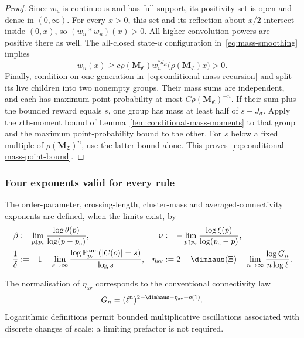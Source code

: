 \begin{proof}
Since $w_u$ is continuous and has full support, its positivity set is open and dense in $(0,\infty)$.
For every $x>0$, this set and its reflection about $x/2$ intersect inside $(0,x)$, so $(w_u*w_u)(x)>0$.
All higher convolution powers are positive there as well.
The all-closed state-$u$ configuration in~\eqref{eq:mass-smoothing} implies
\[
 w_u(x)\ge c\rho(\mathbf M_{\mathfrak C})
 w_u^{*d_R}\bigl(\rho(\mathbf M_{\mathfrak C})x\bigr)>0.
\]
Finally, condition on one generation in~\eqref{eq:conditional-mass-recursion} and split its live children into two nonempty groups.
Their mass sums are independent, and each has maximum point probability at most $C\rho(\mathbf M_{\mathfrak C})^{-n}$.
If their sum plus the bounded reward equals $s$, one group has mass at least half of $s-J_\sigma$.
Apply the $r$th-moment bound of Lemma~\ref{lem:conditional-mass-moments} to that group and the maximum point-probability bound to the other.
For $s$ below a fixed multiple of $\rho(\mathbf M_{\mathfrak C})^n$, use the latter bound alone.
This proves~\eqref{eq:conditional-mass-point-bound}.
\end{proof}


\subsubsection*{Four exponents valid for every rule}
\begin{definition}\label{def:four-exponents}
The order-parameter, crossing-length, cluster-mass and averaged-connectivity exponents are defined, when the limits exist, by
\begin{align*}
 \beta&:=\lim_{p\downarrow p_c}\frac{\log\theta(p)}{\log(p-p_c)},&
 \nu&:=-\lim_{p\uparrow p_c}\frac{\log\xi(p)}{\log(p_c-p)},\\
 \frac1\delta&:=-1-\lim_{s\to\infty}
 \frac{\log\mathbb P_{p_c}^{\mathrm{ann}}(|C(o)|=s)}{\log s},&
 \eta_{\mathrm{av}}&:=2-\dimhaus(\Xi)
 -\lim_{n\to\infty}\frac{\log G_n}{n\log\ell}.
\end{align*}
\end{definition}
The normalisation of $\eta_{\mathrm{av}}$ corresponds to the conventional connectivity law
\[
 G_n=(\ell^n)^{2-\dimhaus-\eta_{\mathrm{av}}+o(1)}.
\]
Logarithmic definitions permit bounded multiplicative oscillations associated with discrete changes of scale; a limiting prefactor is not required.

